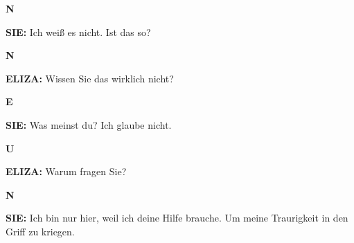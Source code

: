 \documentclass{article}
\begin{document}
\vspace{0.5cm}

\begin{minipage}[t]{0.13\textwidth}
  \centering
  {\bfseries\fontsize{14.4}{14.4}\selectfont\textcolor{pastelblue}{N}}
\end{minipage}%
\begin{minipage}[t]{0.81\textwidth}
  \textbf{SIE:} Ich weiß es nicht. Ist das so?
\end{minipage}

\vspace{0.5cm}

\begin{minipage}[t]{0.13\textwidth}
  \centering
  {\bfseries\fontsize{14.4}{14.4}\selectfont\textcolor{pastelblue}{N}}
\end{minipage}%
\begin{minipage}[t]{0.81\textwidth}
  \textbf{ELIZA:} Wissen Sie das wirklich nicht?
\end{minipage}

\vspace{0.5cm}

\begin{minipage}[t]{0.13\textwidth}
  \centering
  {\bfseries\fontsize{14.4}{14.4}\selectfont\textcolor{pastelblue}{E}}
\end{minipage}%
\begin{minipage}[t]{0.81\textwidth}
  \textbf{SIE:} Was meinst du? Ich glaube nicht.
\end{minipage}

\vspace{0.5cm}

\begin{minipage}[t]{0.13\textwidth}
  \centering
  {\bfseries\fontsize{14.4}{14.4}\selectfont\textcolor{pastelblue}{U}}
\end{minipage}%
\begin{minipage}[t]{0.81\textwidth}
  \textbf{ELIZA:} Warum fragen Sie?
\end{minipage}

\vspace{0.5cm}

\begin{minipage}[t]{0.13\textwidth}
  \centering
  {\bfseries\fontsize{14.4}{14.4}\selectfont\textcolor{pastelblue}{N}}
\end{minipage}%
\begin{minipage}[t]{0.81\textwidth}
  \textbf{SIE:} Ich bin nur hier, weil ich deine Hilfe brauche. Um meine Traurigkeit in den Griff zu kriegen.
\end{minipage}
\end{document}
